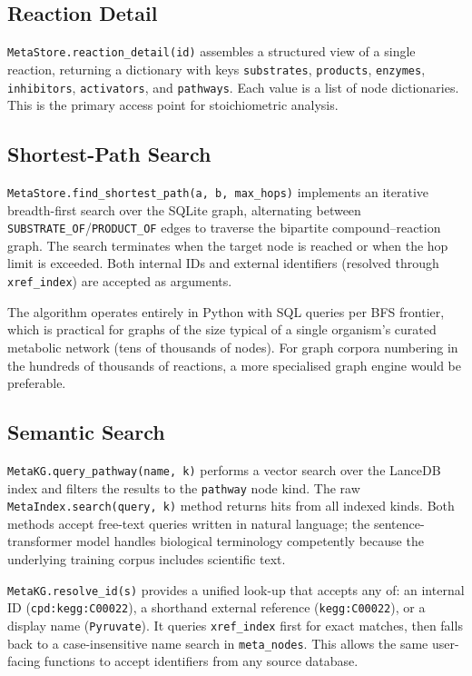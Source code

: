 \documentclass[10pt]{article}
\begin{document}
\subsection{Reaction Detail}

\texttt{MetaStore.reaction\_detail(id)} assembles a structured view of a
single reaction, returning a dictionary with keys \texttt{substrates},
\texttt{products}, \texttt{enzymes}, \texttt{inhibitors}, \texttt{activators},
and \texttt{pathways}. Each value is a list of node dictionaries. This is the
primary access point for stoichiometric analysis.

\subsection{Shortest-Path Search}

\texttt{MetaStore.find\_shortest\_path(a, b, max\_hops)} implements an
iterative breadth-first search over the SQLite graph, alternating between
\texttt{SUBSTRATE\_OF}/\texttt{PRODUCT\_OF} edges to traverse the bipartite
compound--reaction graph. The search terminates when the target node is reached
or when the hop limit is exceeded. Both internal IDs and external identifiers
(resolved through \texttt{xref\_index}) are accepted as arguments.

The algorithm operates entirely in Python with SQL queries per BFS frontier,
which is practical for graphs of the size typical of a single organism's
curated metabolic network (tens of thousands of nodes). For graph corpora
numbering in the hundreds of thousands of reactions, a more specialised graph
engine would be preferable.

\subsection{Semantic Search}

\texttt{MetaKG.query\_pathway(name, k)} performs a vector search over the
LanceDB index and filters the results to the \texttt{pathway} node kind.
The raw \texttt{MetaIndex.search(query, k)} method returns hits from all
indexed kinds. Both methods accept free-text queries written in natural
language; the sentence-transformer model handles biological terminology
competently because the underlying training corpus includes scientific text.

\texttt{MetaKG.resolve\_id(s)} provides a unified look-up that accepts
any of: an internal ID (\texttt{cpd:kegg:C00022}), a shorthand external
reference (\texttt{kegg:C00022}), or a display name (\texttt{Pyruvate}).
It queries \texttt{xref\_index} first for exact matches, then falls back to a
case-insensitive name search in \texttt{meta\_nodes}. This allows the same
user-facing functions to accept identifiers from any source database.
\end{document}
